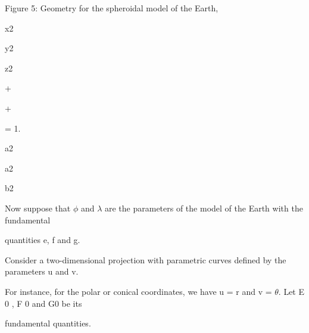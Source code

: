 \documentclass[a4paper,portrait,12pt]{article}
\begin{document}
\begin{flushleft}
\newpage
Figure 5: Geometry for the spheroidal model of the Earth,
\end{flushleft}





\begin{flushleft}
x2
\end{flushleft}


\begin{flushleft}
y2
\end{flushleft}


\begin{flushleft}
z2
\end{flushleft}


+


+


= 1.


\begin{flushleft}
a2
\end{flushleft}


\begin{flushleft}
a2
\end{flushleft}


\begin{flushleft}
b2
\end{flushleft}





\begin{flushleft}
Now suppose that $\phi$ and $\lambda$ are the parameters of the model of the Earth with the fundamental
\end{flushleft}


\begin{flushleft}
quantities e, f and g.
\end{flushleft}


\begin{flushleft}
Consider a two-dimensional projection with parametric curves defined by the parameters u and v.
\end{flushleft}


\begin{flushleft}
For instance, for the polar or conical coordinates, we have u = r and v = $\theta$. Let E 0 , F 0 and G0 be its
\end{flushleft}


\begin{flushleft}
fundamental quantities.
\end{flushleft}
\end{document}
